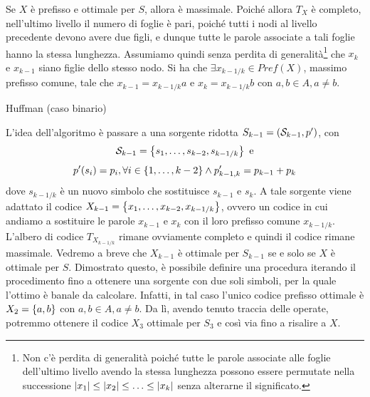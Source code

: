 Se \(X\) è prefisso e ottimale per \(S\), allora è massimale. 
Poiché allora \(T_X\) è completo, nell'ultimo livello il numero di foglie è pari, poiché tutti i nodi al livello precedente devono avere due figli,
e dunque tutte le parole associate a tali foglie hanno la stessa lunghezza.
Assumiamo quindi senza perdita di generalità\footnote{Non c'è perdita di generalità poiché tutte le parole associate alle foglie dell'ultimo livello avendo la stessa lunghezza possono essere permutate nella successione \(\left|x_1\right|\leq\left|x_2\right|\leq\ldots\leq\left|x_k\right|\) senza alterarne il significato.}
che \(x_k\) e \(x_{k-1}\) siano figlie dello stesso nodo.
Si ha che \(\exists x_{k-1/k}\in Pref(X)\), massimo prefisso comune, tale che \(x_{k-1} = x_{k-1/k}a\) e \(x_k = x_{k-1/k}b\) con \(a,b \in A, a \neq b\).
\begin{algorithmdesc}{Huffman (caso binario)}
  
  L'idea dell'algoritmo è passare a una sorgente ridotta \(S_{k-1} =(\mathcal{S}_{k-1}, p')\), con
  \[\SCal_{k-1} = \set{s_1,\ldots,s_{k-2}, s_{k-1/k}} \text{ e}\]
  \[p'(s_i)=p_i, \forall i \in \set{1,\ldots,k-2} \land p_{k-1,k}' = p_{k-1} + p_k\] 
  dove \(s_{k-1/k}\) è un nuovo simbolo che sostituisce \(s_{k-1}\) e \(s_k\).
  A tale sorgente viene adattato il codice \(X_{k-1} = \set{x_1,\ldots,x_{k-2}, x_{k-1/k}}\), ovvero un codice in cui andiamo a sostituire le parole \(x_{k-1}\) e \(x_k\) con il loro prefisso comune \(x_{k-1/k}\).
  L'albero di codice \(T_{X_{k-1/k}}\) rimane ovviamente completo e quindi il codice rimane massimale.
  Vedremo a breve che \(X_{k-1}\) è ottimale per \(S_{k-1}\) se e solo se \(X\) è ottimale per \(S\).
  Dimostrato questo, è possibile definire una procedura iterando il procedimento fino a ottenere una sorgente con due soli simboli, per la quale l'ottimo è banale da calcolare.
  Infatti, in tal caso l'unico codice prefisso ottimale è \(X_2 = \set{a,b}\) con \(a,b \in A, a \neq b\).
  Da lì, avendo tenuto traccia delle  operate, potremmo ottenere il codice \(X_3\) ottimale per \(S_3\) e così via fino a risalire a \(X\).
\end{algorithmdesc}

